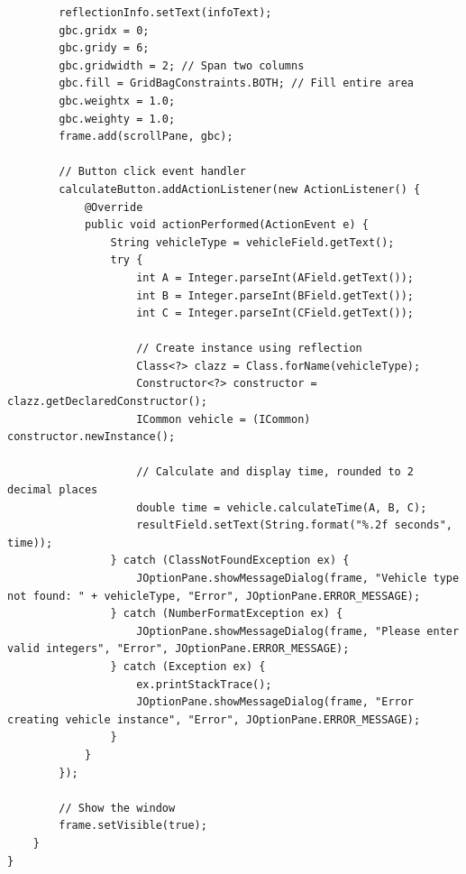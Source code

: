 \documentclass[12pt,a4paper]{article}
\begin{document}
\begin{lstlisting}
        reflectionInfo.setText(infoText);
        gbc.gridx = 0;
        gbc.gridy = 6;
        gbc.gridwidth = 2; // Span two columns
        gbc.fill = GridBagConstraints.BOTH; // Fill entire area
        gbc.weightx = 1.0;
        gbc.weighty = 1.0;
        frame.add(scrollPane, gbc);

        // Button click event handler
        calculateButton.addActionListener(new ActionListener() {
            @Override
            public void actionPerformed(ActionEvent e) {
                String vehicleType = vehicleField.getText();
                try {
                    int A = Integer.parseInt(AField.getText());
                    int B = Integer.parseInt(BField.getText());
                    int C = Integer.parseInt(CField.getText());

                    // Create instance using reflection
                    Class<?> clazz = Class.forName(vehicleType);
                    Constructor<?> constructor = clazz.getDeclaredConstructor();
                    ICommon vehicle = (ICommon) constructor.newInstance();

                    // Calculate and display time, rounded to 2 decimal places
                    double time = vehicle.calculateTime(A, B, C);
                    resultField.setText(String.format("%.2f seconds", time));
                } catch (ClassNotFoundException ex) {
                    JOptionPane.showMessageDialog(frame, "Vehicle type not found: " + vehicleType, "Error", JOptionPane.ERROR_MESSAGE);
                } catch (NumberFormatException ex) {
                    JOptionPane.showMessageDialog(frame, "Please enter valid integers", "Error", JOptionPane.ERROR_MESSAGE);
                } catch (Exception ex) {
                    ex.printStackTrace();
                    JOptionPane.showMessageDialog(frame, "Error creating vehicle instance", "Error", JOptionPane.ERROR_MESSAGE);
                }
            }
        });

        // Show the window
        frame.setVisible(true);
    }
}


\end{lstlisting}
\end{document}
